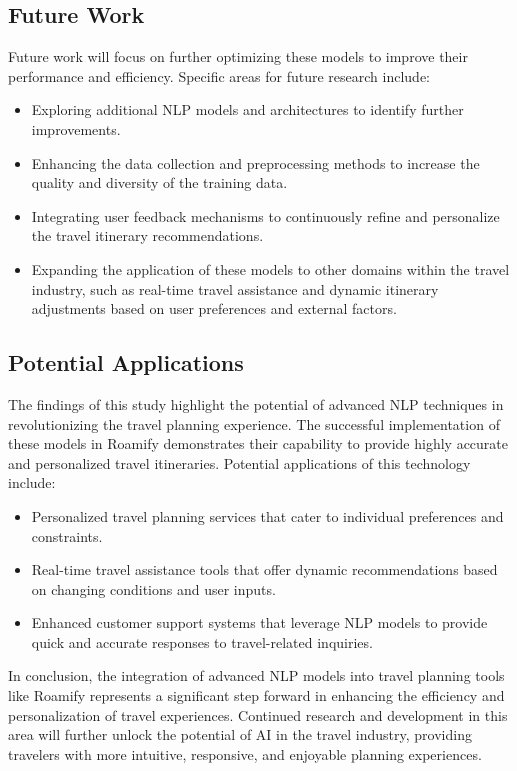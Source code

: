 \documentclass[conference]{IEEEtran}
\begin{document}
    \subsection{Future Work}

        Future work will focus on further optimizing these models to improve their performance and efficiency. Specific areas for future research include:
        \begin{itemize}
            \item Exploring additional NLP models and architectures to identify further improvements.
            \item Enhancing the data collection and preprocessing methods to increase the quality and diversity of the training data.
            \item Integrating user feedback mechanisms to continuously refine and personalize the travel itinerary recommendations.
            \item Expanding the application of these models to other domains within the travel industry, such as real-time travel assistance and dynamic itinerary adjustments based on user preferences and external factors.
        \end{itemize}

    \subsection{Potential Applications}

        The findings of this study highlight the potential of advanced NLP techniques in revolutionizing the travel planning experience. The successful implementation of these models in Roamify demonstrates their capability to provide highly accurate and personalized travel itineraries. Potential applications of this technology include:
        \begin{itemize}
            \item Personalized travel planning services that cater to individual preferences and constraints.
            \item Real-time travel assistance tools that offer dynamic recommendations based on changing conditions and user inputs.
            \item Enhanced customer support systems that leverage NLP models to provide quick and accurate responses to travel-related inquiries.
        \end{itemize}

        In conclusion, the integration of advanced NLP models into travel planning tools like Roamify represents a significant step forward in enhancing the efficiency and personalization of travel experiences. Continued research and development in this area will further unlock the potential of AI in the travel industry, providing travelers with more intuitive, responsive, and enjoyable planning experiences.
\end{document}

